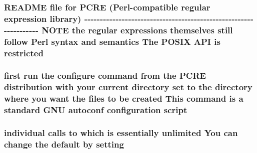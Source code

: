\subsubsection[{\texorpdfstring{restricted}{restricted}}]{\setlength{\rightskip}{0pt plus 5cm}R\+E\+A\+D\+ME {\bf file} for {\bf P\+C\+RE} ({\bf Perl}-\/compatible regular {\bf expression} {\bf library}) -\/-\/-\/-\/-\/-\/-\/-\/-\/-\/-\/-\/-\/-\/-\/-\/-\/-\/-\/-\/-\/-\/-\/-\/-\/-\/-\/-\/-\/-\/-\/-\/-\/-\/-\/-\/-\/-\/-\/-\/-\/-\/-\/-\/-\/-\/-\/-\/-\/-\/-\/-\/-\/-\/-\/-\/-\/-\/-\/-\/-\/-\/-\/-\/-\/ {\bf N\+O\+TE} the regular {\bf expressions} {\bf themselves} {\bf still} follow {\bf Perl} syntax and semantics The P\+O\+S\+IX {\bf A\+PI} {\bf is} restricted}\hypertarget{README_8txt_aa0245533db24acb149ba3953f45a0492}{}\label{README_8txt_aa0245533db24acb149ba3953f45a0492}
\subsubsection[{\texorpdfstring{script}{script}}]{ {\bf first} {\bf run} the {\bf configure} {\bf command} {\bf from} the {\bf P\+C\+RE} distribution {\bf with} your {\bf current} {\bf directory} {\bf set} {\bf to} the {\bf directory} {\bf where} you want the {\bf files} {\bf to} {\bf be} created This {\bf command} {\bf is} {\bf a} standard G\+NU autoconf configuration script}\hypertarget{README_8txt_a41b65e586de03cc0c2b067f07bb22277}{}\label{README_8txt_a41b65e586de03cc0c2b067f07bb22277}
\subsubsection[{\texorpdfstring{setting}{setting}}]{\setlength{\rightskip}{0pt plus 5cm}individual {\bf calls} {\bf to} {\bf which} {\bf is} essentially unlimited You {\bf can} change the {\bf default} by setting}\hypertarget{README_8txt_adbbbedb625469ba85798fd2e72c24316}{}\label{README_8txt_adbbbedb625469ba85798fd2e72c24316}
